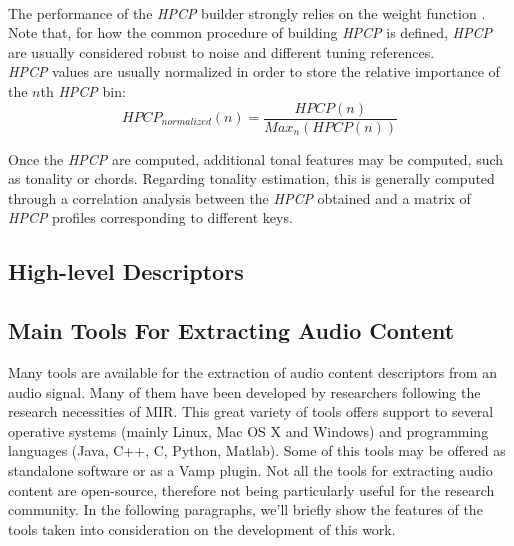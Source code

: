 \begin{itemize}
\\ The performance of the \textit{HPCP} builder strongly relies on the weight function \cite{cabral05}. Note that, for how the common procedure of building \textit{HPCP} is defined, \textit{HPCP} are usually considered robust to noise and different tuning references. \\
\textit{HPCP} values are usually normalized in order to store the relative importance of the $n$th \textit{HPCP} bin:
\begin{equation}
HPCP_{normalized}(n) = \frac{HPCP(n)}{Max_n(HPCP(n))}
\end{equation}
\end{itemize}

Once the \textit{HPCP} are computed, additional tonal features may be computed, such as tonality or chords. Regarding tonality estimation, this is generally computed through a correlation analysis between the \textit{HPCP} obtained and a matrix of \textit{HPCP} profiles corresponding to different keys. 

\subsection{High-level Descriptors}

\subsection{Main Tools For Extracting Audio Content}
Many tools are available for the extraction of audio content descriptors from an audio signal. Many of them have been developed by researchers following the research necessities of MIR. This great variety of tools offers support to several operative systems (mainly Linux, Mac OS X and Windows) and programming languages (Java, C++, C, Python, Matlab). Some of this tools may be offered as standalone software or as a Vamp plugin. Not all the tools for extracting audio content are open-source, therefore not being particularly useful for the research community. In the following paragraphs, we'll briefly show the features of the tools taken into consideration on the development of this work.
